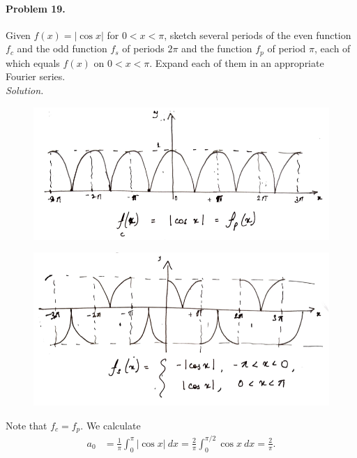 \documentclass[10pt]{article}
\begin{document}
        \paragraph{Problem 19.} Given $f(x) = |\cos{x}|$ for $0 < x < \pi$, sketch several periods of the even function $f_c$ and
        the odd function $f_s$ of periods $2\pi$ and the function $f_p$ of period $\pi$, each of which equals $f(x)$ on $0 < x < \pi$.
        Expand each of them in an appropriate Fourier series. \\

        \textit{Solution.}
        \begin{figure}[H]
                \centering        
                \includegraphics[scale=0.5]{./7_19_fc.png}
        \end{figure}
        \begin{figure}[H]
                \centering        
                \includegraphics[scale=0.5]{./7_19_fs.png}
        \end{figure}
        Note that $f_c = f_p$. We calculate
        \begin{align*}
                a_0 &= \frac{1}{\pi}\int_0^\pi |\cos{x}|\:dx = \frac{2}{\pi}\int_0^{\pi /2}\cos{x}\:dx = \frac{2}{\pi}. \\
        \end{align*}
\end{document}
